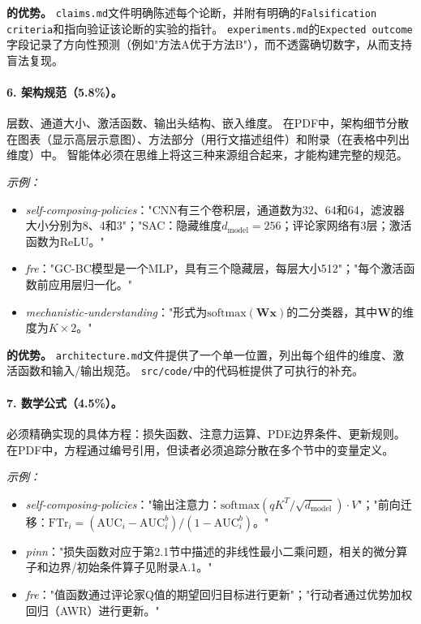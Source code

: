\noindent\textbf{\ara{}的优势。}
\texttt{claims.md}文件明确陈述每个论断，并附有明确的\texttt{Falsification criteria}和指向验证该论断的实验的指针。
\texttt{experiments.md}的\texttt{Expected outcome}字段记录了方向性预测（例如"方法A优于方法B"），而不透露确切数字，从而支持盲法复现。

\paragraph{6. 架构规范（5.8\%）。}
层数、通道大小、激活函数、输出头结构、嵌入维度。
在PDF中，架构细节分散在图表（显示高层示意图）、方法部分（用行文描述组件）和附录（在表格中列出维度）中。
智能体必须在思维上将这三种来源组合起来，才能构建完整的规范。

\emph{示例：}
\begin{itemize}[leftmargin=*, itemsep=1pt]
  \item \emph{self-composing-policies}："CNN有三个卷积层，通道数为32、64和64，滤波器大小分别为8、4和3"；"SAC：隐藏维度$d_{\text{model}} = 256$；评论家网络有3层；激活函数为ReLU。"
  \item \emph{fre}："GC-BC模型是一个MLP，具有三个隐藏层，每层大小512"；"每个激活函数前应用层归一化。"
  \item \emph{mechanistic-understanding}："形式为$\text{softmax}(\mathbf{Wx})$的二分类器，其中$\mathbf{W}$的维度为$K \times 2$。"
\end{itemize}

\noindent\textbf{\ara{}的优势。}
\texttt{architecture.md}文件提供了一个单一位置，列出每个组件的维度、激活函数和输入/输出规范。
\texttt{src/code/}中的代码桩提供了可执行的补充。

\paragraph{7. 数学公式（4.5\%）。}
必须精确实现的具体方程：损失函数、注意力运算、PDE边界条件、更新规则。
在PDF中，方程通过编号引用，但读者必须追踪分散在多个节中的变量定义。

\emph{示例：}
\begin{itemize}[leftmargin=*, itemsep=1pt]
  \item \emph{self-composing-policies}："输出注意力：$\text{softmax}(qK^T / \sqrt{d_{\text{model}}}) \cdot V$"；"前向迁移：$\text{FTr}_i = (\text{AUC}_i - \text{AUC}_i^b) / (1 - \text{AUC}_i^b)$。"
  \item \emph{pinn}："损失函数对应于第2.1节中描述的非线性最小二乘问题，相关的微分算子和边界/初始条件算子见附录A.1。"
  \item \emph{fre}："值函数通过评论家Q值的期望回归目标进行更新"；"行动者通过优势加权回归（AWR）进行更新。"
\end{itemize}

